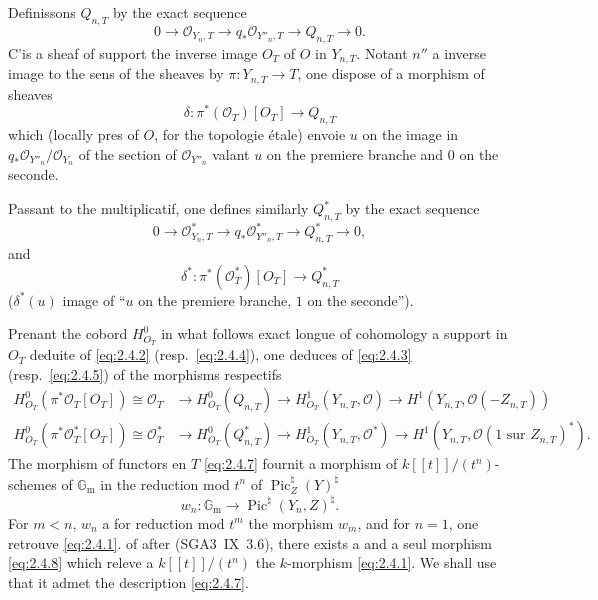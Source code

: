 \documentclass[12pt,a4paper]{article}
\theoremstyle{plain}
\theoremstyle{definition}
\theoremstyle{remark}
\DeclareMathOperator{\Pic}{Pic}
\newcommand{\OO}{\mathcal{O}}
\newcommand{\Gm}{\mathbb{G}_{\mathrm{m}}}
\providecommand{\Gm}{\mathbb{G}_{\mathrm m}}
\begin{document}
Definissons $Q_{n,T}$ by the exact sequence
\begin{equation}\label{eq:2.4.2}
0\to\OO_{Y_n,T}\to q_*\OO_{Y''_n,T}\to Q_{n,T}\to 0.
\end{equation}
C'is a sheaf of support the inverse image $O_T$ of $O$ in $Y_{n,T}$. Notant $n''$
a inverse image to the sens of the sheaves by $\pi:Y_{n,T}\to T$, one dispose of a morphism
of sheaves
\begin{equation}\label{eq:2.4.3}
\delta:\pi^*(\OO_T)[O_T]\to Q_{n,T}
\end{equation}
which (locally pres of $O$, for the topologie étale) envoie $u$ on the image in
$q_*\OO_{Y''_n}/\OO_{Y_n}$ of the section of $\OO_{Y''_n}$ valant $u$ on the premiere branche and $0$ on
the seconde.

Passant to the multiplicatif, one defines similarly $Q^*_{n,T}$ by the exact sequence
\begin{equation}\label{eq:2.4.4}
0\to\OO^*_{Y_n,T}\to q_*\OO^*_{Y''_n,T}\to Q^*_{n,T}\to 0,
\end{equation}
and
\begin{equation}\label{eq:2.4.5}
\delta^*:\pi^*(\OO_T^*)[O_T]\to Q^*_{n,T}
\end{equation}
($\delta^*(u)$ image of ``$u$ on the premiere branche, $1$ on the seconde'').

Prenant the cobord $H^0_{O_T}$ in what follows exact longue of cohomology a
support in $O_T$ deduite of \eqref{eq:2.4.2} (resp.~\eqref{eq:2.4.4}), one deduces of
\eqref{eq:2.4.3} (resp.~\eqref{eq:2.4.5}) of the morphisms respectifs
\begin{align}
H^0_{O_T}(\pi^*\OO_T[O_T])\cong\OO_T &\to H^0_{O_T}(Q_{n,T})\to H^1_{O_T}(Y_{n,T},\OO)\to H^1(Y_{n,T},\OO(-Z_{n,T}))\label{eq:2.4.6}\\
H^0_{O_T}(\pi^*\OO^*_T[O_T])\cong\OO^*_T &\to H^0_{O_T}(Q^*_{n,T})\to H^1_{O_T}(Y_{n,T},\OO^*)\to H^1(Y_{n,T},\OO(\text{1 sur }Z_{n,T})^*).\label{eq:2.4.7}
\end{align}
The morphism of functors en $T$ \eqref{eq:2.4.7} fournit a morphism of
$k[[t]]/(t^n)$-schemes of $\Gm$ in the reduction mod $t^n$ of $\Pic_Z^\natural(Y)^\natural$
\begin{equation}\label{eq:2.4.8}
w_n:\Gm\to\Pic^\natural(Y_n,Z)^\natural.
\end{equation}
For $m<n$, $w_n$ a for reduction mod $t^m$ the morphism $w_m$, and for $n=1$, one
retrouve \eqref{eq:2.4.1}. of after (SGA3~IX~3.6), there exists a and a seul morphism
\eqref{eq:2.4.8} which releve a $k[[t]]/(t^n)$ the $k$-morphism \eqref{eq:2.4.1}. We shall use that it admet the description \eqref{eq:2.4.7}.
\end{document}
